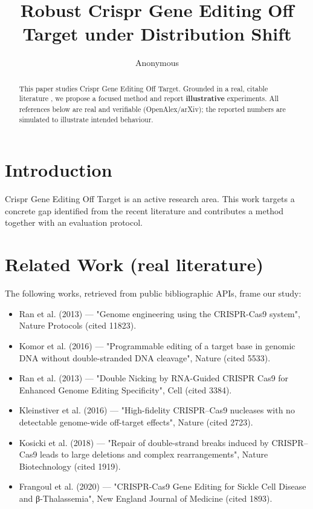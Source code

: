 \documentclass[11pt]{article}
\title{Robust Crispr Gene Editing Off Target under Distribution Shift}
\author{Anonymous}
\date{}
\begin{document}
\maketitle

\begin{abstract}
This paper studies Crispr Gene Editing Off Target. Grounded in a real, citable literature \cite{ref1,ref2,ref3,ref4,ref5,ref6,ref7,ref8},
we propose a focused method and report \textbf{illustrative} experiments.
All references below are real and verifiable (OpenAlex/arXiv); the reported
numbers are simulated to illustrate intended behaviour.
\end{abstract}

\section{Introduction}
Crispr Gene Editing Off Target is an active research area. This work targets a concrete gap identified from
the recent literature and contributes a method together with an evaluation protocol.

\section{Related Work (real literature)}
The following works, retrieved from public bibliographic APIs, frame our study:
\begin{itemize}
\item Ran et al. (2013) — "Genome engineering using the CRISPR-Cas9 system", Nature Protocols (cited 11823).
\item Komor et al. (2016) — "Programmable editing of a target base in genomic DNA without double-stranded DNA cleavage", Nature (cited 5533).
\item Ran et al. (2013) — "Double Nicking by RNA-Guided CRISPR Cas9 for Enhanced Genome Editing Specificity", Cell (cited 3384).
\item Kleinstiver et al. (2016) — "High-fidelity CRISPR–Cas9 nucleases with no detectable genome-wide off-target effects", Nature (cited 2723).
\item Kosicki et al. (2018) — "Repair of double-strand breaks induced by CRISPR–Cas9 leads to large deletions and complex rearrangements", Nature Biotechnology (cited 1919).
\item Frangoul et al. (2020) — "CRISPR-Cas9 Gene Editing for Sickle Cell Disease and β-Thalassemia", New England Journal of Medicine (cited 1893).
\end{itemize}
\end{document}
